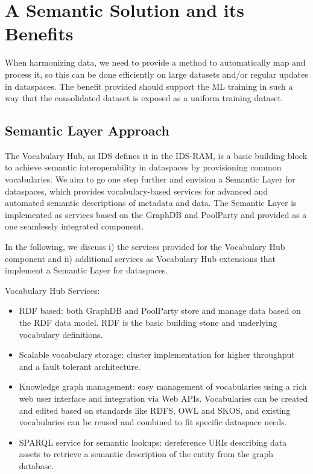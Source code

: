 \documentclass[
  super,
  preprint,
  3p]{elsarticle}
\providecommand{\tightlist}{%
  \setlength{\itemsep}{0pt}\setlength{\parskip}{0pt}}\usepackage{longtable,booktabs,array}
\begin{document}
\section{A Semantic Solution and its
Benefits}\label{a-semantic-solution-and-its-benefits}

When harmonizing data, we need to provide a method to automatically map
and process it, so this can be done efficiently on large datasets and/or
regular updates in dataspaces. The benefit provided should support the
ML training in such a way that the consolidated dataset is exposed as a
uniform training dataset.

\subsection{Semantic Layer Approach}\label{semantic-layer-approach}

The Vocabulary Hub, as IDS defines it in the IDS-RAM, is a basic
building block to achieve semantic interoperability in dataspaces by
provisioning common vocabularies. We aim to go one step further and
envision a Semantic Layer for dataspaces, which provides
vocabulary-based services for advanced and automated semantic
descriptions of metadata and data. The Semantic Layer is implemented as
services based on the GraphDB and PoolParty and provided as a one
seamlessly integrated component.

In the following, we discuss i) the services provided for the Vocabulary
Hub component and ii) additional services as Vocabulary Hub extensions
that implement a Semantic Layer for dataspaces.

Vocabulary Hub Services:

\begin{itemize}
\tightlist
\item
  RDF based: both GraphDB and PoolParty store and manage data based on
  the RDF data model. RDF is the basic building stone and underlying
  vocabulary definitions.
\item
  Scalable vocabulary storage: cluster implementation for higher
  throughput and a fault tolerant architecture.
\item
  Knowledge graph management: easy management of vocabularies using a
  rich web user interface and integration via Web APIs. Vocabularies can
  be created and edited based on standards like RDFS, OWL and SKOS, and
  existing vocabularies can be reused and combined to fit specific
  dataspace needs.
\item
  SPARQL service for semantic lookups: dereference URIs describing data
  assets to retrieve a semantic description of the entity from the graph
  database.
\end{itemize}
\end{document}
